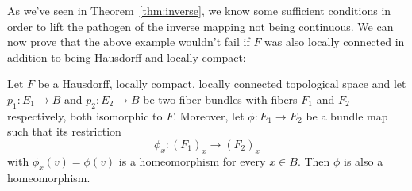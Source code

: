 As we've seen in Theorem~\ref{thm:inverse}, we know some sufficient conditions in order to lift the pathogen of the inverse mapping not being continuous. We can now prove that the above example wouldn't fail if $F$ was also locally connected in addition to being Hausdorff and locally compact:


\begin{theorem} Let $F$ be a Hausdorff, locally compact, locally connected topological space and let $p_1: E_1\to B$ and $p_2: E_2\to B$ be two fiber bundles with fibers $F_1$ and $F_2$ respectively, both isomorphic to $F$. Moreover, let $\phi:E_1\to E_2$ be a bundle map such that its restriction
\[\phi_x:(F_1)_x\to (F_2)_x\]
with $\phi_x(v)=\phi(v)$ is a homeomorphism for every $x\in B$. Then $\phi$ is also a homeomorphism.
\end{theorem}
